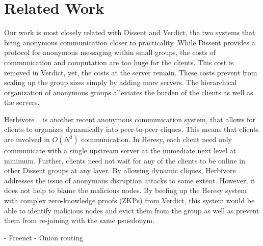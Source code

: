 \section{Related Work}
\label{sec:related}
Our work is most closely related with Dissent and Verdict, the two systems that bring anonymous communication closer to practicality. While Dissent provides a protocol for anonymous messaging within small groups, the costs of communication and computation are too huge for the clients. This cost is removed in Verdict, yet, the costs at the server remain. These costs prevent from scaling up the group sizes simply by adding more servers. The hierarchical organization of anonymous groups alleviates the burden of the clients as well as the servers.


Herbivore ~\cite{herbivore:tr} is another recent anonymous communication system, that allows for clients to organizes dynamically into peer-to-peer cliques. This means that clients are involved in $O(N^2)$ communication. In Heresy, each client need only communicate with a single upstream server at the immediate next level at minimum. Further, clients need not wait for any of the clients to be online in other Dissent groups at any layer. By allowing dynamic cliques, Herbivore addresses the issue of anonymous disruption attacks to some extent. However, it does not help to blame the malicious nodes. By beefing up the Heresy system with complex zero-knowledge proofs (ZKPs) from Verdict, this system would be able to identify malicious nodes and evict them from the group as well as prevent them from re-joining with the same psuedonym.

- Freenet
- Onion routing